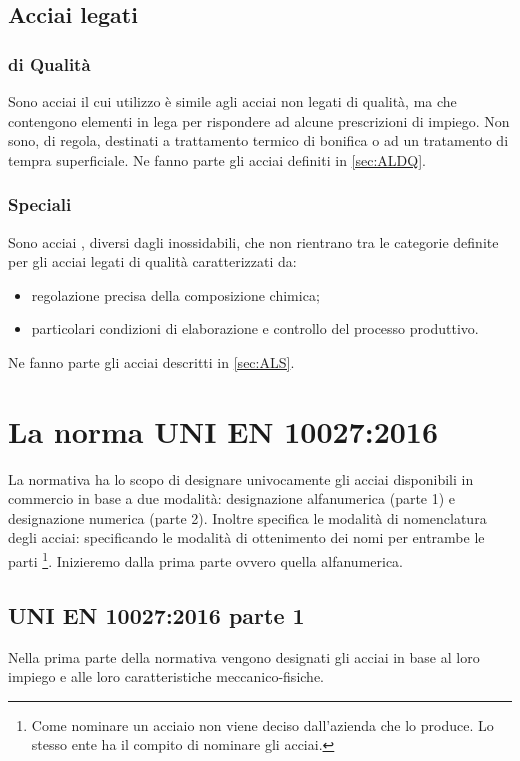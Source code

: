 \subsection{Acciai legati}
\begin{multicols}{2}[]
\subsubsection{di Qualità}
Sono acciai il cui utilizzo è simile agli acciai non legati di qualità, ma che contengono elementi in lega per rispondere ad alcune prescrizioni di impiego.
Non sono, di regola, destinati a trattamento termico di bonifica o ad un tratamento di tempra superficiale.
Ne fanno parte gli acciai definiti in \ref{sec:ALDQ}.
\columnbreak
\subsubsection{Speciali}
Sono acciai , diversi dagli inossidabili, che non rientrano tra le categorie definite per gli acciai legati di qualità caratterizzati da:
\begin{itemize}
\item regolazione precisa della composizione chimica;
\item particolari condizioni di elaborazione e controllo del processo produttivo.
\end{itemize}
Ne fanno parte gli acciai descritti in \ref{sec:ALS}.
\end{multicols}

\section{La norma UNI EN 10027:2016}
La normativa ha lo scopo di designare univocamente gli acciai disponibili in commercio in base a due modalità: designazione alfanumerica (parte 1) e designazione numerica (parte 2).
Inoltre specifica le modalità di nomenclatura degli acciai: specificando le modalità di ottenimento dei nomi per entrambe le parti%
\footnote{Come nominare un acciaio non viene deciso dall'azienda che lo produce. Lo stesso ente ha il compito di nominare gli acciai.}.
Inizieremo dalla prima parte ovvero quella alfanumerica.
\subsection{UNI EN 10027:2016 parte 1}
Nella prima parte della normativa vengono designati gli acciai in base al loro impiego e alle loro caratteristiche meccanico-fisiche.

